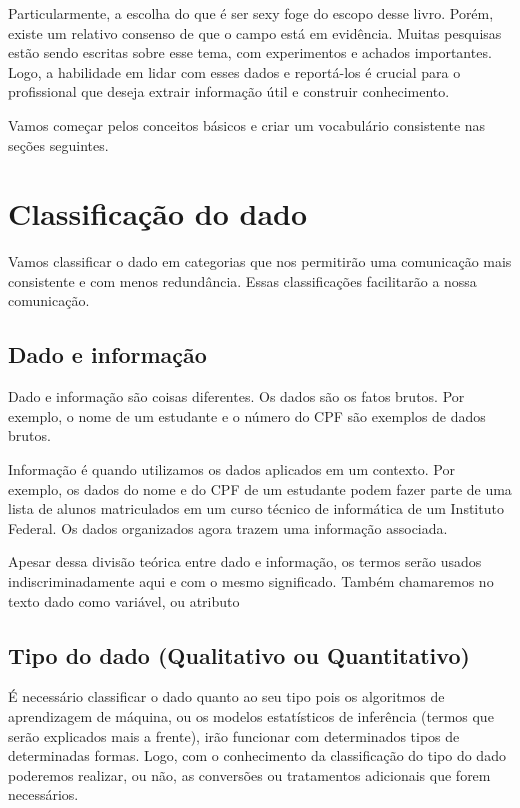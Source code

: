 \documentclass[
]{book}
\begin{document}
Particularmente, a escolha do que é ser sexy foge do escopo desse livro. Porém, existe um relativo consenso de que o campo está em evidência. Muitas pesquisas estão sendo escritas sobre esse tema, com experimentos e achados importantes. Logo, a habilidade em lidar com esses dados e reportá-los é crucial para o profissional que deseja extrair informação útil e construir conhecimento.

Vamos começar pelos conceitos básicos e criar um vocabulário consistente nas seções seguintes.

\chapter{Classificação do dado}\label{classificauxe7uxe3o-do-dado}

Vamos classificar o dado em categorias que nos permitirão uma comunicação mais consistente e com menos redundância. Essas classificações facilitarão a nossa comunicação.

\section{Dado e informação}\label{dado-e-informauxe7uxe3o}

Dado e informação são coisas diferentes. Os dados são os fatos brutos. Por exemplo, o nome de um estudante e o número do CPF são exemplos de dados brutos.

Informação é quando utilizamos os dados aplicados em um contexto. Por exemplo, os dados do nome e do CPF de um estudante podem fazer parte de uma lista de alunos matriculados em um curso técnico de informática de um Instituto Federal. Os dados organizados agora trazem uma informação associada.

Apesar dessa divisão teórica entre dado e informação, os termos serão usados indiscriminadamente aqui e com o mesmo significado. Também chamaremos no texto dado como variável, ou atributo

\section{Tipo do dado (Qualitativo ou Quantitativo)}\label{tipo-do-dado-qualitativo-ou-quantitativo}

É necessário classificar o dado quanto ao seu tipo pois os algoritmos de aprendizagem de máquina, ou os modelos estatísticos de inferência (termos que serão explicados mais a frente), irão funcionar com determinados tipos de determinadas formas. Logo, com o conhecimento da classificação do tipo do dado poderemos realizar, ou não, as conversões ou tratamentos adicionais que forem necessários.
\end{document}

